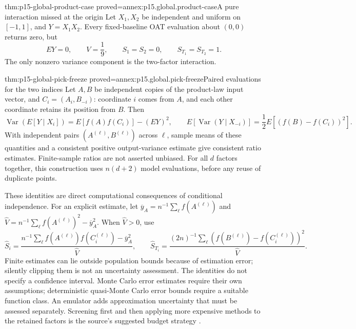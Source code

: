 \begin{hbtheorem}{thm:p15-global-product-case}
 {proved=annex:p15.global.product-case}{A pure interaction missed at the origin}
Let \(X_1,X_2\) be independent and uniform on \([-1,1]\), and
\(Y=X_1X_2\). Every fixed-baseline OAT evaluation about \((0,0)\)
returns zero, but
\[
 EY=0,\qquad V=\frac19,\qquad
 S_1=S_2=0,\qquad S_{T_1}=S_{T_2}=1.
\]
The only nonzero variance component is the two-factor interaction.
\end{hbtheorem}

\begin{hbtheorem}{thm:p15-global-pick-freeze}
 {proved=annex:p15.global.pick-freeze}{Paired evaluations for the two indices}
Let \(A,B\) be independent copies of the product-law input vector, and
\(C_i=(A_i,B_{-i})\): coordinate \(i\) comes from \(A\), and each other
coordinate retains its position from \(B\). Then
\[
 \operatorname{Var}(E[Y\mid X_i])
   =E[f(A)f(C_i)]-(EY)^2,
\qquad
 E[\operatorname{Var}(Y\mid X_{-i})]
   =\frac12E[(f(B)-f(C_i))^2].
\]
With independent pairs \((A^{(\ell)},B^{(\ell)})\) across
\(\ell\), sample means of these quantities and a consistent positive
output-variance estimate give consistent ratio estimates.
Finite-sample ratios are not asserted unbiased.
For all \(d\) factors together, this construction uses \(n(d+2)\)
model evaluations, before any reuse of duplicate points.
\end{hbtheorem}

These identities are direct computational consequences of conditional
independence. For an explicit estimate, let
\(\overline y_A=n^{-1}\sum_\ell f(A^{(\ell)})\) and
\(\widehat V=n^{-1}\sum_\ell f(A^{(\ell)})^2-\overline y_A^2\).
When \(\widehat V>0\), use
\[
 \widehat S_i=
 \frac{n^{-1}\sum_\ell f(A^{(\ell)})f(C_i^{(\ell)})
                         -\overline y_A^2}{\widehat V},
\qquad
 \widehat S_{T_i}=
 \frac{(2n)^{-1}\sum_\ell
       (f(B^{(\ell)})-f(C_i^{(\ell)}))^2}{\widehat V}.
\]
Finite estimates can lie outside population bounds because of estimation
error; silently clipping them is not an uncertainty assessment.
The identities do not specify a confidence interval.
Monte Carlo error estimates require their own assumptions; deterministic
quasi-Monte Carlo error bounds require a suitable function class.
An emulator adds approximation uncertainty that must be assessed
separately. Screening first and then applying more expensive methods to
the retained factors is the source's suggested budget strategy
\cite[Sections 5.4 and 7]{SaltelliAnnoni2010Sensitivity}.

